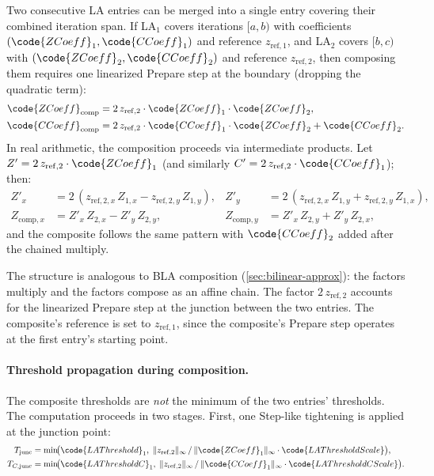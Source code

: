 Two consecutive LA entries can be merged into a single entry covering their
combined iteration span.  If LA\(_1\) covers iterations \([a,b)\) with
coefficients \((\code{ZCoeff}_1, \code{CCoeff}_1)\) and reference
\(z_\mathrm{ref,1}\), and LA\(_2\) covers \([b,c)\) with
\((\code{ZCoeff}_2, \code{CCoeff}_2)\) and reference \(z_\mathrm{ref,2}\),
then composing them requires one linearized Prepare step at the boundary
(dropping the quadratic term):
\begin{align}
\code{ZCoeff}_\mathrm{comp}
  &= 2\,z_\mathrm{ref,2}\cdot\code{ZCoeff}_1\cdot\code{ZCoeff}_2,
  \label{eq:la-comp-z} \\
\code{CCoeff}_\mathrm{comp}
  &= 2\,z_\mathrm{ref,2}\cdot\code{CCoeff}_1\cdot\code{ZCoeff}_2
   + \code{CCoeff}_2.
  \label{eq:la-comp-c}
\end{align}
In real arithmetic, the composition proceeds via intermediate products.
Let $Z' = 2\,z_{\mathrm{ref},2} \cdot \code{ZCoeff}_1$ (and similarly
$C' = 2\,z_{\mathrm{ref},2} \cdot \code{CCoeff}_1$); then:
\begin{align}
Z'_x &= 2\,(z_{\mathrm{ref},2,x}\,Z_{1,x} - z_{\mathrm{ref},2,y}\,Z_{1,y}), &
Z'_y &= 2\,(z_{\mathrm{ref},2,x}\,Z_{1,y} + z_{\mathrm{ref},2,y}\,Z_{1,x}), \\
Z_{\mathrm{comp},x} &= Z'_x\,Z_{2,x} - Z'_y\,Z_{2,y}, &
Z_{\mathrm{comp},y} &= Z'_x\,Z_{2,y} + Z'_y\,Z_{2,x},
\end{align}
and the composite  follows the same pattern with
$\code{CCoeff}_2$ added after the chained multiply.

The structure is analogous to BLA composition (\cref{sec:bilinear-approx}):
the  factors multiply and the  factors compose
as an affine chain.  The factor \(2\,z_\mathrm{ref,2}\) accounts for
the linearized Prepare step at the junction between the two entries.
The composite's reference is set to \(z_\mathrm{ref,1}\), since the
composite's Prepare step operates at the first entry's starting point.

\paragraph{Threshold propagation during composition.}
The composite thresholds are \emph{not} the minimum of the two
entries' thresholds.  The computation proceeds in two stages.  First,
one Step-like tightening is applied at the junction point:
\begin{align}
T_\mathrm{junc}
  &= \min\!\bigl(
       \code{LAThreshold}_1,\;
       \lVert z_\mathrm{ref,2} \rVert_\infty
       \,/\, \lVert \code{ZCoeff}_1 \rVert_\infty
       \cdot \code{LAThresholdScale}
     \bigr),
\label{eq:la-comp-thresh-junc}
\\
T_{C,\mathrm{junc}}
  &= \min\!\bigl(
       \code{LAThresholdC}_1,\;
       \lVert z_\mathrm{ref,2} \rVert_\infty
       \,/\, \lVert \code{CCoeff}_1 \rVert_\infty
       \cdot \code{LAThresholdCScale}
     \bigr).
\end{align}

